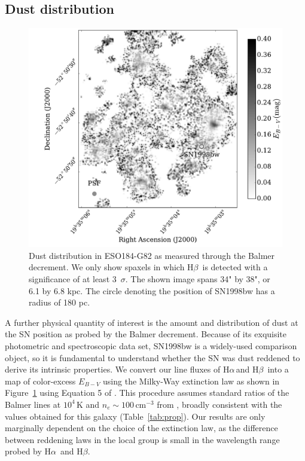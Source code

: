 \documentclass[traditabstract]{aa}
\newcommand{\hb}{H$\beta$}
\newcommand{\ha}{H$\alpha$}
\begin{document}
\subsection{Dust distribution}

\begin{figure}
\includegraphics[angle=0, width=0.99\columnwidth]{Figs/MUSE_SN1998bw_EB-V.pdf}
\caption{Dust distribution in ESO184-G82 as measured through the Balmer decrement. We only show spaxels in which \hb\, is detected with a significance of at least 3~$\sigma$. The shown image spans 34" by 38", or 6.1 by 6.8 kpc. The circle denoting the position of SN1998bw has a radius of 180 pc.}
\label{fig:ebv}
\end{figure}

A further physical quantity of interest is the amount and distribution of dust at the SN position as probed by the Balmer decrement. Because of its exquisite photometric and spectroscopic data set, SN1998bw is a widely-used comparison object, so it is fundamental to understand whether the SN was dust reddened to derive its intrinsic properties. We convert our line fluxes of \ha\,and \hb\, into a map of color-excess $E_{B-V}$ using the Milky-Way extinction law as shown in Figure~\ref{fig:ebv} using Equation 5 of \citet{2015A&A...581A.125K}. This procedure assumes standard ratios of the Balmer lines at $10^4$\,K and $n_e\sim100\,\mathrm{cm}^{-3}$ from \citet{1989agna.book.....O}, broadly consistent with the values obtained for this galaxy (Table~\ref{tab:prop}). Our results are only marginally dependent on the choice of the extinction law, as the difference between reddening laws in the local group is small in the wavelength range probed by \ha\, and \hb. 
\end{document}
